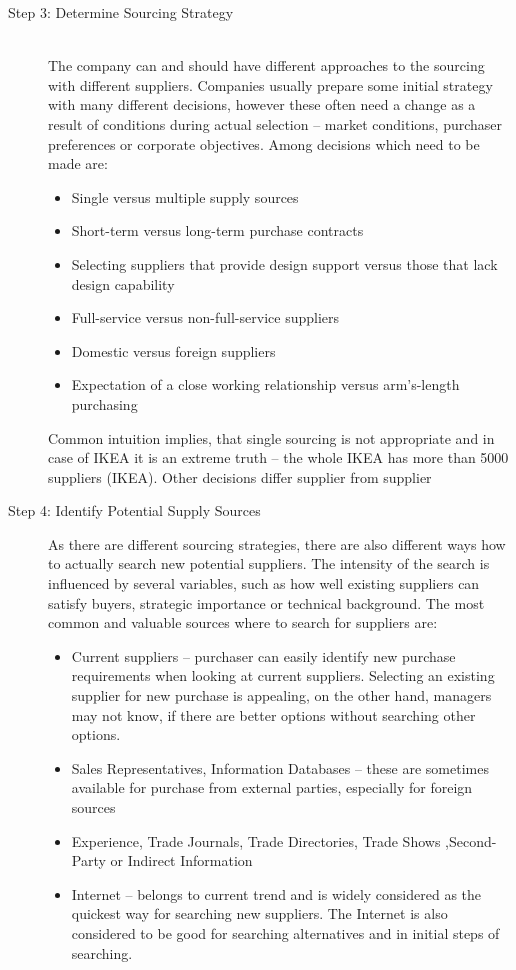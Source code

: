 \documentclass[oneside,12pt]{article}%
\begin{document}
\begin{description}
  \item[Step 3: Determine Sourcing Strategy] \hfill \\
  The company can and should have different approaches to the sourcing with different suppliers. Companies usually prepare some initial strategy with many different decisions, however these often need a change as a result of conditions during actual selection – market conditions, purchaser preferences or corporate objectives. Among decisions which need to be made are:
  \begin{itemize}
  \item Single versus multiple supply sources
  \item Short-term versus long-term purchase contracts
  \item Selecting suppliers that provide design support versus those that lack design capability
  \item Full-service versus non-full-service suppliers
  \item Domestic versus foreign suppliers
  \item Expectation of a close working relationship versus arm’s-length purchasing
  \end{itemize}
  Common intuition implies, that single sourcing is not appropriate and in case of IKEA it is an extreme truth – the whole IKEA has more than 5000 suppliers (IKEA). Other decisions differ supplier from supplier


  \item[Step 4: Identify Potential Supply Sources]
  As there are different sourcing strategies, there are also different ways how to actually search new potential suppliers. The intensity of the search is influenced by several variables, such as how well existing suppliers can satisfy buyers, strategic importance or technical background. The most common and valuable sources where to search for suppliers are:
  \begin{itemize}
    \item Current suppliers – purchaser can easily identify new purchase requirements when looking at current suppliers. Selecting an existing supplier for new purchase is appealing, on the other hand, managers may not know, if there are better options without searching other options.
    \item Sales Representatives, Information Databases – these are sometimes available for purchase from external parties, especially for foreign sources
    \item Experience, Trade Journals, Trade Directories, Trade Shows ,Second-Party or Indirect Information
    \item Internet – belongs to current trend and is widely considered as the quickest way for searching new suppliers. The Internet is also considered to be good for searching alternatives and in initial steps of searching.


\end{itemize}
\end{description}
\end{document}
